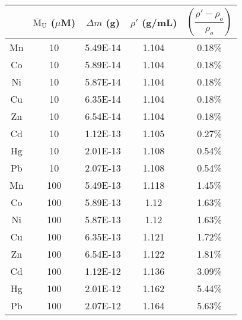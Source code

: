 \begin{tabular}{ccccc}
	\toprule
	& $\bar{\text{M}}_{\text{U}}$ ($\mu$M)
	& $\Delta m$ (g)
	& $\rho'$ (g/mL)
	& $\left(\dfrac{\rho'-\rho_o}{\rho_o}\right)$ \\
	\midrule
	Mn & 10 & 5.49E-14 & 1.104 & 0.18\% \\
	Co & 10 & 5.89E-14 & 1.104 & 0.18\% \\
	Ni & 10 & 5.87E-14 & 1.104 & 0.18\% \\
	Cu & 10 & 6.35E-14 & 1.104 & 0.18\% \\
	Zn & 10 & 6.54E-14 & 1.104 & 0.18\% \\
	Cd & 10 & 1.12E-13 & 1.105 & 0.27\% \\
	Hg & 10 & 2.01E-13 & 1.108 & 0.54\% \\
	Pb & 10 & 2.07E-13 & 1.108 & 0.54\% \\
	\midrule
	Mn & 100 & 5.49E-13 & 1.118 & 1.45\% \\
	Co & 100 & 5.89E-13 & 1.12 & 1.63\% \\
	Ni & 100 & 5.87E-13 & 1.12 & 1.63\% \\
	Cu & 100 & 6.35E-13 & 1.121 & 1.72\% \\
	Zn & 100 & 6.54E-13 & 1.122 & 1.81\% \\
	Cd & 100 & 1.12E-12 & 1.136 & 3.09\% \\
	Hg & 100 & 2.01E-12 & 1.162 & 5.44\% \\
	Pb & 100 & 2.07E-12 & 1.164 & 5.63\% \\
	\bottomrule
\end{tabular}

